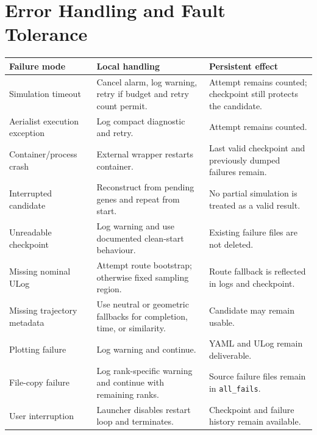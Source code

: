 \documentclass[11pt,a4paper]{report}
\newcommand{\code}[1]{\texttt{#1}}
\begin{document}
\section{Error Handling and Fault Tolerance}
\begin{table}[H]
\centering
\begin{tabularx}{\textwidth}{L{4cm} Y Y}
\toprule
\textbf{Failure mode} & \textbf{Local handling} & \textbf{Persistent effect}\\
\midrule
Simulation timeout & Cancel alarm, log warning, retry if budget and retry count permit. & Attempt remains counted; checkpoint still protects the candidate.\\
Aerialist execution exception & Log compact diagnostic and retry. & Attempt remains counted.\\
Container/process crash & External wrapper restarts container. & Last valid checkpoint and previously dumped failures remain.\\
Interrupted candidate & Reconstruct from pending genes and repeat from start. & No partial simulation is treated as a valid result.\\
Unreadable checkpoint & Log warning and use documented clean-start behaviour. & Existing failure files are not deleted.\\
Missing nominal ULog & Attempt route bootstrap; otherwise fixed sampling region. & Route fallback is reflected in logs and checkpoint.\\
Missing trajectory metadata & Use neutral or geometric fallbacks for completion, time, or similarity. & Candidate may remain usable.\\
Plotting failure & Log warning and continue. & YAML and ULog remain deliverable.\\
File-copy failure & Log rank-specific warning and continue with remaining ranks. & Source failure files remain in \code{all\_fails}.\\
User interruption & Launcher disables restart loop and terminates. & Checkpoint and failure history remain available.\\
\bottomrule
\end{tabularx}
\end{table}
\end{document}
